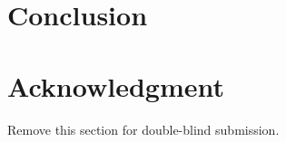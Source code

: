 \documentclass[conference]{IEEEtran}
\begin{document}

\section{Conclusion}
\label{sec:conclusion}

\section*{Acknowledgment}
Remove this section for double-blind submission.



\end{document}
